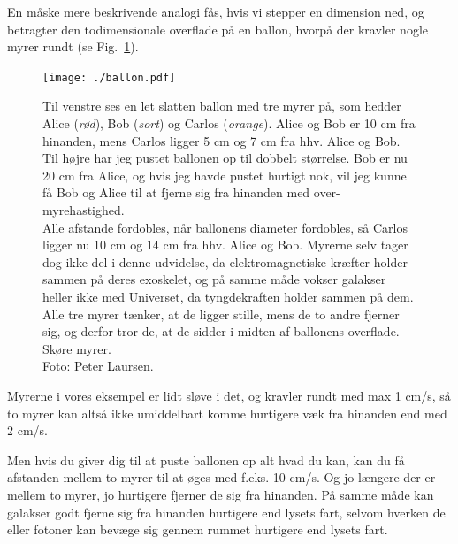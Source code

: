 \documentclass[useAMS,danish]{aa}
\begin{document}
En måske mere beskrivende analogi fås, hvis vi stepper en dimension ned, og betragter den todimensionale overflade på en ballon, hvorpå der kravler nogle myrer rundt (se Fig.~\ref{fig:ballon}).
\begin{figure}[!t]
    \centering
    \texttt{[image: ./ballon.pdf]}
    \caption{\small{
        Til venstre ses en let slatten ballon med tre myrer på, som hedder Alice (\emph{rød}), Bob (\emph{sort}) og Carlos (\emph{orange}).
        Alice og Bob er 10 cm fra hinanden, mens Carlos ligger 5 cm og 7 cm fra hhv. Alice og Bob.
        Til højre har jeg pustet ballonen op til dobbelt størrelse.
        Bob er nu 20 cm fra Alice, og hvis jeg havde pustet hurtigt nok, vil jeg kunne få Bob og Alice til at fjerne sig fra hinanden med over-myrehastighed.\\
        Alle afstande fordobles, når ballonens diameter fordobles, så Carlos ligger nu 10 cm og 14 cm fra hhv. Alice og Bob.
        Myrerne selv tager dog ikke del i denne udvidelse, da elektromagnetiske kræfter holder sammen på deres exoskelet, og på samme måde vokser galakser heller ikke med Universet, da tyngdekraften holder sammen på dem.
        Alle tre myrer tænker, at de ligger stille, mens de to andre fjerner sig, og derfor tror de, at de sidder i midten af ballonens overflade.
        Skøre myrer.\\
        Foto: Peter Laursen.}
    }
    \label{fig:ballon}
\end{figure}
Myrerne i vores eksempel er lidt sløve i det, og kravler rundt med max 1 cm/s, så to myrer kan altså ikke umiddelbart komme hurtigere væk fra hinanden end med 2 cm/s.
%
\begin{figure}
    \caption*{{\sf {}}}
\end{figure}
%
Men hvis du giver dig til at puste ballonen op alt hvad du kan, kan du få afstanden mellem to myrer til at øges med f.eks. 10 cm/s.
Og jo længere der er mellem to myrer, jo hurtigere fjerner de sig fra hinanden.
På samme måde kan galakser godt fjerne sig fra hinanden hurtigere end lysets fart, selvom hverken de eller fotoner kan bevæge sig gennem rummet hurtigere end lysets fart.
\end{document}
